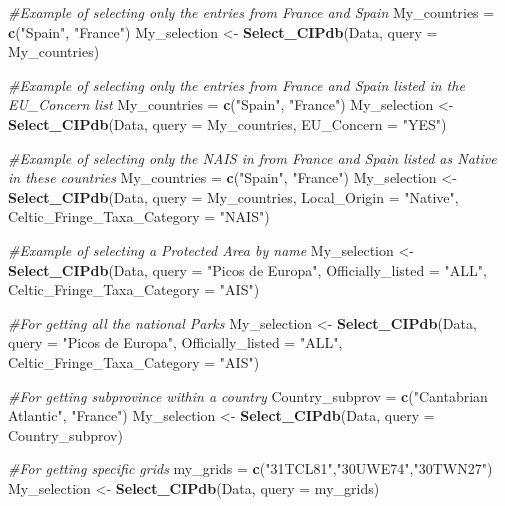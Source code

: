 \documentclass[
]{article}
\newenvironment{Shaded}{\begin{snugshade}}{\end{snugshade}}
\newcommand{\AttributeTok}[1]{\textcolor[rgb]{0.13,0.29,0.53}{#1}}
\newcommand{\CommentTok}[1]{\textcolor[rgb]{0.56,0.35,0.01}{\textit{#1}}}
\newcommand{\FunctionTok}[1]{\textcolor[rgb]{0.13,0.29,0.53}{\textbf{#1}}}
\newcommand{\NormalTok}[1]{#1}
\newcommand{\OtherTok}[1]{\textcolor[rgb]{0.56,0.35,0.01}{#1}}
\newcommand{\StringTok}[1]{\textcolor[rgb]{0.31,0.60,0.02}{#1}}
\begin{document}
\begin{Shaded}
\begin{Highlighting}[]
\CommentTok{\#Example of selecting only the entries from France and Spain}
\NormalTok{My\_countries }\OtherTok{=} \FunctionTok{c}\NormalTok{(}\StringTok{"Spain"}\NormalTok{, }\StringTok{"France"}\NormalTok{)}
\NormalTok{My\_selection }\OtherTok{\textless{}{-}} \FunctionTok{Select\_CIPdb}\NormalTok{(Data, }\AttributeTok{query =}\NormalTok{ My\_countries)}

 \CommentTok{\#Example of selecting only the entries from France and Spain listed in the EU\_Concern list}
\NormalTok{My\_countries }\OtherTok{=} \FunctionTok{c}\NormalTok{(}\StringTok{"Spain"}\NormalTok{, }\StringTok{"France"}\NormalTok{)}
\NormalTok{My\_selection }\OtherTok{\textless{}{-}} \FunctionTok{Select\_CIPdb}\NormalTok{(Data, }\AttributeTok{query =}\NormalTok{ My\_countries, }\AttributeTok{EU\_Concern =} \StringTok{"YES"}\NormalTok{)}

\CommentTok{\#Example of selecting only the NAIS in  from France and Spain listed as Native in these countries}
\NormalTok{My\_countries }\OtherTok{=} \FunctionTok{c}\NormalTok{(}\StringTok{"Spain"}\NormalTok{, }\StringTok{"France"}\NormalTok{)}
\NormalTok{My\_selection }\OtherTok{\textless{}{-}} \FunctionTok{Select\_CIPdb}\NormalTok{(Data, }\AttributeTok{query =}\NormalTok{ My\_countries, }\AttributeTok{Local\_Origin =} \StringTok{"Native"}\NormalTok{, }\AttributeTok{Celtic\_Fringe\_Taxa\_Category =} \StringTok{"NAIS"}\NormalTok{)}

\CommentTok{\#Example of selecting a Protected Area by name}
\NormalTok{My\_selection }\OtherTok{\textless{}{-}} \FunctionTok{Select\_CIPdb}\NormalTok{(Data, }\AttributeTok{query =} \StringTok{"Picos de Europa"}\NormalTok{, }\AttributeTok{Officially\_listed =} \StringTok{"ALL"}\NormalTok{, }\AttributeTok{Celtic\_Fringe\_Taxa\_Category =} \StringTok{"AIS"}\NormalTok{)}

\CommentTok{\#For getting all the national Parks}
\NormalTok{My\_selection }\OtherTok{\textless{}{-}} \FunctionTok{Select\_CIPdb}\NormalTok{(Data, }\AttributeTok{query =} \StringTok{"Picos de Europa"}\NormalTok{, }\AttributeTok{Officially\_listed =} \StringTok{"ALL"}\NormalTok{, }\AttributeTok{Celtic\_Fringe\_Taxa\_Category =} \StringTok{"AIS"}\NormalTok{)}

\CommentTok{\#For getting subprovince within a country}
\NormalTok{Country\_subprov }\OtherTok{=} \FunctionTok{c}\NormalTok{(}\StringTok{"Cantabrian Atlantic"}\NormalTok{, }\StringTok{"France"}\NormalTok{)}
\NormalTok{My\_selection }\OtherTok{\textless{}{-}} \FunctionTok{Select\_CIPdb}\NormalTok{(Data, }\AttributeTok{query =}\NormalTok{ Country\_subprov)}

\CommentTok{\#For getting specific grids}
\NormalTok{my\_grids }\OtherTok{=} \FunctionTok{c}\NormalTok{(}\StringTok{"31TCL81"}\NormalTok{,}\StringTok{"30UWE74"}\NormalTok{,}\StringTok{"30TWN27"}\NormalTok{)}
\NormalTok{My\_selection }\OtherTok{\textless{}{-}} \FunctionTok{Select\_CIPdb}\NormalTok{(Data, }\AttributeTok{query =}\NormalTok{ my\_grids)}
\end{Highlighting}
\end{Shaded}
\end{document}
